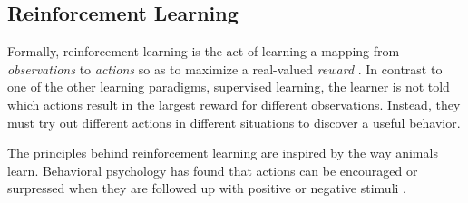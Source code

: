 \subsection{Reinforcement Learning}
Formally, reinforcement learning is the act of learning a mapping from \textit{observations} to \textit{actions} so as to maximize a real-valued \textit{reward} \cite{bible}. In contrast to one of the other learning paradigms, supervised learning, the learner is not told which actions result in the largest reward for different observations. Instead, they must try out different actions in different situations to discover a useful behavior.

The principles behind reinforcement learning are inspired by the way animals learn. Behavioral psychology has found that actions can be encouraged or surpressed when they are followed up with positive or negative stimuli \cite{thorndike}.





